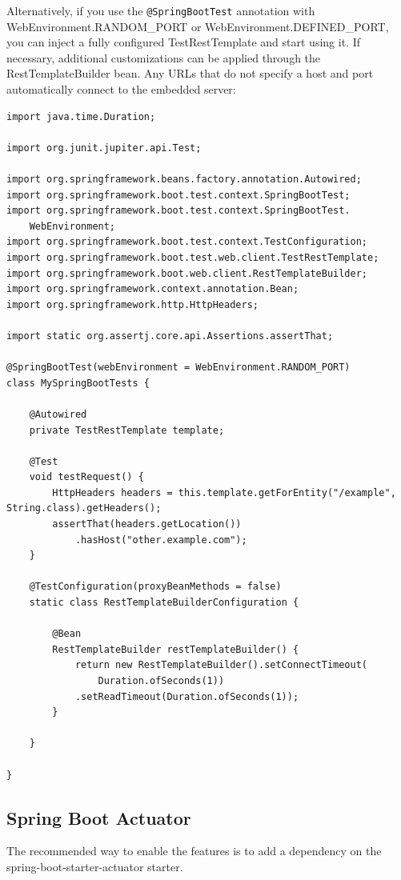 \documentclass{scrartcl}
\begin{document}
Alternatively, if you use the \lstinline|@SpringBootTest| annotation with WebEnvironment.RANDOM\_PORT or WebEnvironment.DEFINED\_PORT, you can inject a fully configured TestRestTemplate and start using it. If necessary, additional customizations can be applied through the RestTemplateBuilder bean. Any URLs that do not specify a host and port automatically connect to the embedded server:

\begin{lstlisting}
import java.time.Duration;

import org.junit.jupiter.api.Test;

import org.springframework.beans.factory.annotation.Autowired;
import org.springframework.boot.test.context.SpringBootTest;
import org.springframework.boot.test.context.SpringBootTest.
    WebEnvironment;
import org.springframework.boot.test.context.TestConfiguration;
import org.springframework.boot.test.web.client.TestRestTemplate;
import org.springframework.boot.web.client.RestTemplateBuilder;
import org.springframework.context.annotation.Bean;
import org.springframework.http.HttpHeaders;

import static org.assertj.core.api.Assertions.assertThat;

@SpringBootTest(webEnvironment = WebEnvironment.RANDOM_PORT)
class MySpringBootTests {

    @Autowired
    private TestRestTemplate template;

    @Test
    void testRequest() {
        HttpHeaders headers = this.template.getForEntity("/example", String.class).getHeaders();
        assertThat(headers.getLocation())
            .hasHost("other.example.com");
    }

    @TestConfiguration(proxyBeanMethods = false)
    static class RestTemplateBuilderConfiguration {

        @Bean
        RestTemplateBuilder restTemplateBuilder() {
            return new RestTemplateBuilder().setConnectTimeout(
                Duration.ofSeconds(1))
            .setReadTimeout(Duration.ofSeconds(1));
        }

    }

}
\end{lstlisting}


\subsection{Spring Boot Actuator}

The recommended way to enable the features is to add a dependency on the spring-boot-starter-actuator starter.
\end{document}
